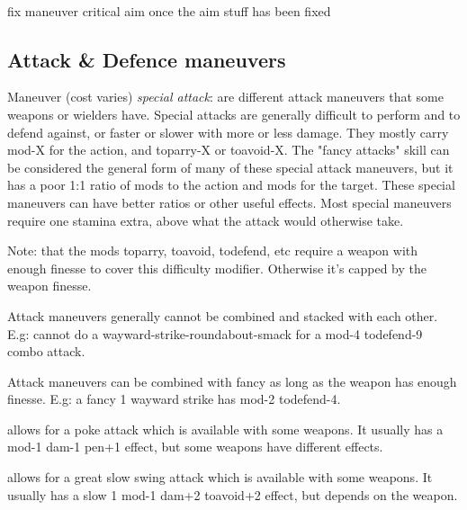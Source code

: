 \

\todo fix maneuver critical aim once the aim stuff has been fixed




\closeskillslist




\subsection*{Attack \& Defence maneuvers}

Maneuver (cost varies) \emph{special attack}: are different attack maneuvers that some weapons or wielders have. Special attacks are generally difficult to perform and to defend against, or faster or slower with more or less damage. They mostly carry mod-X for the action, and toparry-X or toavoid-X. The "fancy attacks" skill can be considered the general form of many of these special attack maneuvers, but it has a poor 1:1 ratio of mods to the action and mods for the target. These special maneuvers can have better ratios or other useful effects. Most special maneuvers require one stamina extra, above what the attack would otherwise take.

Note: that the mods toparry, toavoid, todefend, etc require a weapon with enough finesse to cover this difficulty modifier. Otherwise it's capped by the weapon finesse.

Attack maneuvers generally cannot be combined and stacked with each other. E.g: cannot do a wayward-strike-roundabout-smack for a mod-4 todefend-9 combo attack.

Attack maneuvers can be combined with fancy as long as the weapon has enough finesse. E.g: a fancy 1 wayward strike has mod-2 todefend-4.


\openskillslist


 allows for a poke attack which is available with some weapons. It usually has a mod-1 dam-1 pen+1 effect, but some weapons have different effects.


 allows for a great slow swing attack which is available with some weapons. It usually has a slow 1 mod-1 dam+2 toavoid+2 effect, but depends on the weapon.


